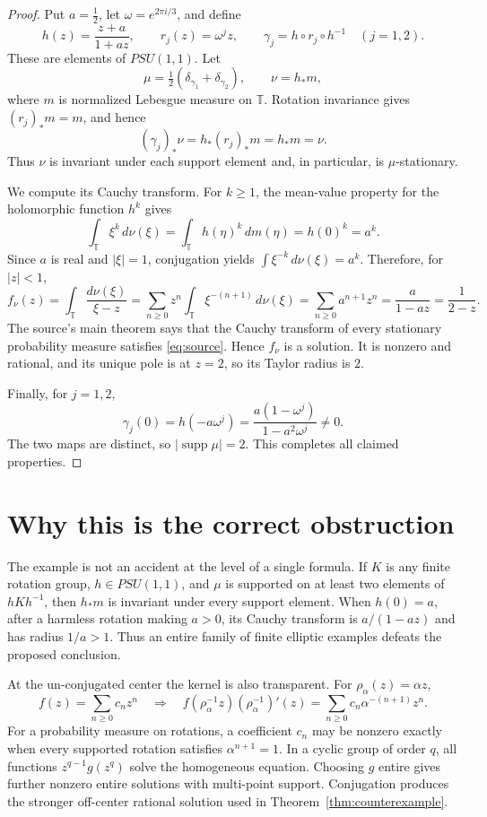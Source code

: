 \documentclass[11pt]{article}
\newcommand{\T}{\mathbb T}
\begin{document}
\begin{proof}
Put $a=\tfrac12$, let $\omega=e^{2\pi i/3}$, and define
\[
 h(z)=\frac{z+a}{1+az},\qquad r_j(z)=\omega^jz,\qquad
 \gamma_j=h\circ r_j\circ h^{-1}\quad(j=1,2).
\]
These are elements of $PSU(1,1)$.  Let
\[
 \mu=\tfrac12(\delta_{\gamma_1}+\delta_{\gamma_2}),
 \qquad \nu=h_*m,
\]
where $m$ is normalized Lebesgue measure on $\T$.  Rotation invariance gives
$(r_j)_*m=m$, and hence
\[
 (\gamma_j)_*\nu=h_*(r_j)_*m=h_*m=\nu.
\]
Thus $\nu$ is invariant under each support element and, in particular, is
$\mu$-stationary.

We compute its Cauchy transform.  For $k\geq1$, the mean-value property for
the holomorphic function $h^k$ gives
\[
 \int_{\T}\xi^k\,d\nu(\xi)
 =\int_{\T}h(\eta)^k\,dm(\eta)=h(0)^k=a^k.
\]
Since $a$ is real and $|\xi|=1$, conjugation yields
$\int\xi^{-k}\,d\nu(\xi)=a^k$.  Therefore, for $|z|<1$,
\[
 f_\nu(z)
 =\int_{\T}\frac{d\nu(\xi)}{\xi-z}
 =\sum_{n\geq0}z^n\int_{\T}\xi^{-(n+1)}\,d\nu(\xi)
 =\sum_{n\geq0}a^{n+1}z^n
 =\frac{a}{1-az}=\frac{1}{2-z}.
\]
The source's main theorem says that the Cauchy transform of every stationary
probability measure satisfies \eqref{eq:source}.  Hence $f_\nu$ is a solution.
It is nonzero and rational, and its unique pole is at $z=2$, so its Taylor
radius is $2$.

Finally, for $j=1,2$,
\[
 \gamma_j(0)=h(-a\omega^j)
 =\frac{a(1-\omega^j)}{1-a^2\omega^j}\neq0.
\]
The two maps are distinct, so $|\operatorname{supp}\mu|=2$.  This completes
all claimed properties.
\end{proof}

\section{\hspace{0.25em}Why this is the correct obstruction}

The example is not an accident at the level of a single formula.  If $K$ is
any finite rotation group, $h\in PSU(1,1)$, and $\mu$ is supported on at least
two elements of $hKh^{-1}$, then $h_*m$ is invariant under every support
element.  When $h(0)=a$, after a harmless rotation making $a>0$, its Cauchy
transform is $a/(1-az)$ and has radius $1/a>1$.  Thus an entire family of
finite elliptic examples defeats the proposed conclusion.

At the un-conjugated center the kernel is also transparent.  For
$\rho_\alpha(z)=\alpha z$,
\[
 f(z)=\sum_{n\geq0}c_nz^n
 \quad\Longrightarrow\quad
 f(\rho_\alpha^{-1}z)(\rho_\alpha^{-1})'(z)
 =\sum_{n\geq0}c_n\alpha^{-(n+1)}z^n.
\]
For a probability measure on rotations, a coefficient $c_n$ may be nonzero
exactly when every supported rotation satisfies $\alpha^{n+1}=1$.  In a
cyclic group of order $q$, all functions $z^{q-1}g(z^q)$ solve the homogeneous
equation.  Choosing $g$ entire gives further nonzero entire solutions with
multi-point support.  Conjugation produces the stronger off-center rational
solution used in Theorem~\ref{thm:counterexample}.
\end{document}
